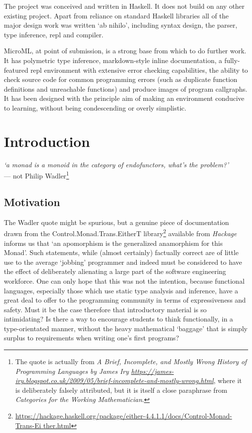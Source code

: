 \documentclass[12pt, a4paper]{report}
\begin{document}
The project was conceived and written in Haskell. It does not build on any other existing
project. Apart from reliance on standard Haskell libraries all of the major design work was
written `ab nihilo', including syntax design, the parser, type inference, repl and compiler.  

MicroML, at point of submission, is a strong base from which to do further work. It has
polymetric type inference, markdown-style inline documentation, a fully-featured repl
environment with extensive error checking capabilities, the ability to check source code for
common programming errors (such as duplicate function definitions and unreachable functions) and
produce images of program callgraphs. It has been designed with the principle aim of making an
environment conducive to learning, without being condescending or overly simplistic. 

\chapter{Introduction}

\begin{flushright} \textit{`a monad is a monoid in the category of endofunctors, what's
the problem?'} \\ --- not Philip Wadler\footnote{The quote is actually from \textit{A
Brief, Incomplete, and Mostly Wrong History of Programming Languages by James Iry
\url{https://james-iry.blogspot.co.uk/2009/05/brief-incomplete-and-mostly-wrong.html}}, where it is
deliberately falsely attributed, but it is itself a close paraphrase from \textit{Categories for the
Working Mathematician}.} 
\end{flushright}

\section{Motivation} 
The Wadler quote might be spurious, but a genuine piece of
documentation drawn from the Control.Monad.Trans.EitherT
library\footnote{\url{https://hackage.haskell.org/package/either-4.4.1.1/docs/Control-Monad-Trans-Ei
ther.html}} available from \textit{Hackage} informs us that `an apomorphism is the generalized
anamorphism for this Monad'. Such statements, while (almost certainly) factually correct are of
little use to the average `jobbing' programmer and indeed must be considered to have the effect
of deliberately alienating a large part of the software engineering workforce. One can only hope
that this was not the intention, because functional languages, especially those which use static
type analysis and inference, have a great deal to offer to the programming community in terms
of expressiveness and safety. Must it be the case therefore that introductory material is so
intimidating? Is there a way to encourage students to think functionally, in a type-orientated
manner, without the heavy mathematical `baggage' that is simply surplus to requirements when writing
one's first programs?
\end{document}
